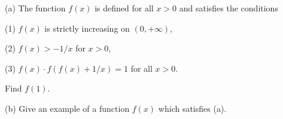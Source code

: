(a) The function $f(x)$ is defined for all $x > 0$ and satisfies the conditions

(1) $f(x)$ is strictly increasing on $(0, +\infty)$,

(2) $f(x) > -1/x$ for $x > 0$,

(3) $f(x) \cdot f(f(x) + 1/x) = 1$ for all $x > 0$.

Find $f(1)$.

(b) Give an example of a function $f(x)$ which satisfies (a).

